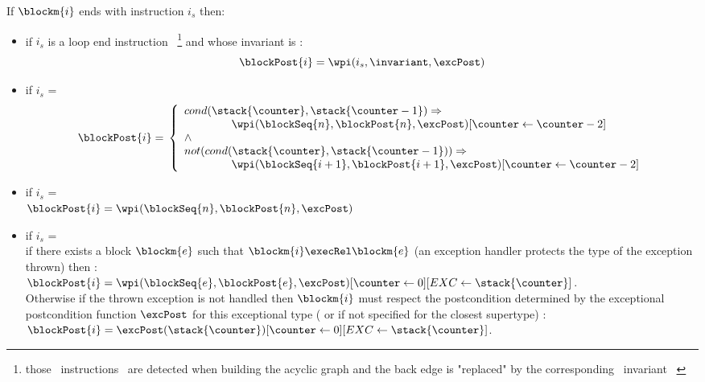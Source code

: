 \begin{defn}\label{post}
 If $\blockm{i}$ ends with instruction $i_s$ then:
 \begin{itemize} 
 \item  if  $i_s$ is a loop end instruction \wpi \ \footnote{those \ instructions \ are detected when building the acyclic graph and the 
 back edge is "replaced"  by the corresponding \ invariant \ \invariant  } and whose invariant is \invariant: 
 $$ \blockPost{i} =  \wpi(  i_s, \invariant, \excPost )  $$ 
 \item if  $i_s$ =   \\
$$
\blockPost{i} =  \\
\left\{
\begin{array}{l}
cond( \stack{\counter}, \stack{\counter - 1} )   \Rightarrow \\
\phantom{ \counter }   \wpi(\blockSeq{n}, \blockPost{n} ,\excPost )[ \counter \leftarrow \counter -2 ]  \\
\wedge \\
 not ( cond( \stack{\counter}, \stack{\counter - 1} )  )   \Rightarrow \\
\phantom{ \counter}    \wpi(\blockSeq{i+1}, \blockPost{i+1},\excPost ) [ \counter \leftarrow \counter -2 ]      \\                             
\end{array}
\right.
$$
\item if  $i_s$ =   \\ 
$\blockPost{i} =  \wpi(\blockSeq{n}, \blockPost{n} , \excPost )$ \\

\item  if  $i_s$ =   \\ 
if there exists a block $\blockm{e}$ such that 
$\blockm{i} \execRel \blockm{e}$ (an exception handler protects the type of the exception thrown)
then :\\
$\blockPost{i }= \\ \wpi(\blockSeq{e}, \blockPost{e} ,\excPost)[\counter \leftarrow 0][EXC \leftarrow \stack{\counter}] $. \\
Otherwise if the thrown exception is not handled then $\blockm{i}$ must respect the postcondition determined by
the exceptional postcondition function $\excPost$ for this exceptional type ( or if not specified for the closest supertype) : \\ 
 $\blockPost{i }= \excPost(\stack{\counter}) [\counter \leftarrow 0][EXC \leftarrow \stack{\counter}] $. \\
    

\end{itemize}
\end{defn}
